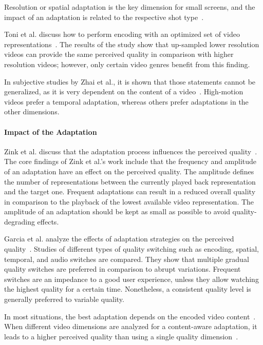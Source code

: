 Resolution or spatial adaptation is the key dimension for small screens, and the impact of an adaptation is related to the respective shot type~\cite{Knoche2007,Knoche2005}.

Toni et al. discuss how to perform encoding with an optimized set of video representations~\cite{Toni2015}. 
The results of the study show that up-sampled lower resolution videos can provide the same perceived quality in comparison with higher resolution videos; however, only certain video genres benefit from this finding.

In subjective studies by Zhai et al., it is shown that those statements cannot be generalized, as it is very dependent on the content of a video~\cite{Zhai2008}.
High-motion videos prefer a temporal adaptation, whereas others prefer adaptations in the other dimensions.
 
\paragraph{Impact of the Adaptation} 
Zink et al. discuss that the adaptation process influences the perceived quality~\cite{Zink2003}.
The core findings of Zink et al.'s work include that the frequency and amplitude of an adaptation have an effect on the perceived quality.
The amplitude defines the number of representations between the currently played back representation and the target one.
Frequent adaptations can result in a reduced overall quality in comparison to the playback of the lowest available video representation.
The amplitude of an adaptation should be kept as small as possible to avoid quality-degrading effects.

Garcia et al. analyze the effects of adaptation strategies on the perceived quality~\cite{Garcia2014}. 
Studies of different types of quality switching such as encoding, spatial, temporal, and audio switches are compared. 
They show that multiple gradual quality switches are preferred in comparison to abrupt variations. 
Frequent switches are an impedance to a good user experience, unless they allow watching the highest quality for a certain time. 
Nonetheless, a consistent quality level is generally preferred to variable quality. 

In most situations, the best adaptation depends on the encoded video content~\cite{Knoche2005,Lee2011,Rajendran2002,Wang2003,Zhai2008}.
When different video dimensions are analyzed for a content-aware adaptation, it leads to a higher perceived quality than using a single quality dimension~\cite{VanDenEnde2007}.

